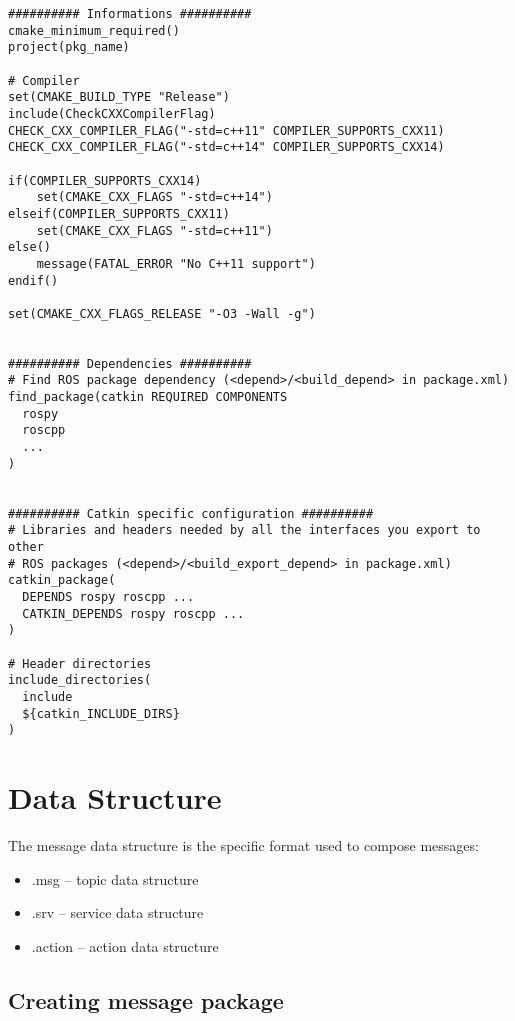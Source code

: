 \begin{verbatim}
########## Informations ##########
cmake_minimum_required()
project(pkg_name)

# Compiler
set(CMAKE_BUILD_TYPE "Release")
include(CheckCXXCompilerFlag)
CHECK_CXX_COMPILER_FLAG("-std=c++11" COMPILER_SUPPORTS_CXX11)
CHECK_CXX_COMPILER_FLAG("-std=c++14" COMPILER_SUPPORTS_CXX14)

if(COMPILER_SUPPORTS_CXX14)
    set(CMAKE_CXX_FLAGS "-std=c++14")
elseif(COMPILER_SUPPORTS_CXX11)
    set(CMAKE_CXX_FLAGS "-std=c++11")
else()
    message(FATAL_ERROR "No C++11 support")
endif()

set(CMAKE_CXX_FLAGS_RELEASE "-O3 -Wall -g")


########## Dependencies ##########
# Find ROS package dependency (<depend>/<build_depend> in package.xml)
find_package(catkin REQUIRED COMPONENTS 
  rospy
  roscpp
  ...
)


########## Catkin specific configuration ##########
# Libraries and headers needed by all the interfaces you export to other 
# ROS packages (<depend>/<build_export_depend> in package.xml)
catkin_package(
  DEPENDS rospy roscpp ...
  CATKIN_DEPENDS rospy roscpp ...
)

# Header directories
include_directories(
  include 
  ${catkin_INCLUDE_DIRS}
)

\end{verbatim}





\section{Data Structure}

    The message data structure is the specific format used to compose messages:
    \begin{itemize}
        \item .msg – topic data structure
        \item .srv – service data structure
        \item .action – action data structure
    \end{itemize}
    
    
    \subsection{Creating message package}
    
